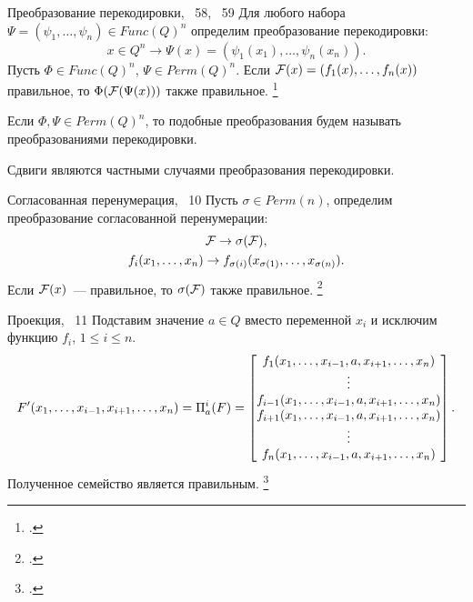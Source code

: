 \begin{frame}
    \begin{mypropos}{Преобразование перекодировки, ~58, ~59}
        \label{thm:reencoding}
        Для любого набора $\Psi = (\psi_1, \ldots, \psi_n) \in Func(Q)^n$ определим преобразование перекодировки:
        \[
            x \in Q^n \to \Psi(x) = (\psi_1(x_1), \ldots, \psi_n(x_n)).
        \]
        Пусть $\Phi \in Func(Q)^n$, $\Psi \in Perm(Q)^n$.
        Если $\mathcal{F}(x) = (f_1(x), \ldots, f_n(x))$ правильное, то $\Phi(\mathcal{F}(\Psi(x)))$ также правильное.
        \footcitetext{galatenko21criterion}
    \end{mypropos}
    \pause
    Если $\Phi, \Psi \in Perm(Q)^n$, то подобные преобразования будем называть преобразованиями перекодировки.
    \pause
    
    Сдвиги являются частными случаями преобразования перекодировки.
\end{frame}


\begin{frame}
    \begin{mypropos}{Согласованная перенумерация, \propos~10}
        Пусть $\sigma \in Perm(n)$, определим преобразование согласованной перенумерации:
        \begin{gather*}
            \mathcal{F} \to \sigma(\mathcal{F}), \\
            f_i(x_1, \ldots, x_n) \to 
            f_{\sigma(i)}(x_{\sigma(1)}, \ldots, x_{\sigma(n)}).
        \end{gather*}
        Если $\mathcal{F}(x)$~--- правильное, то $\sigma(\mathcal{F})$ также правильное.
        \footcitetext{nosov06abel}
    \end{mypropos}
\end{frame}


\begin{frame}
    \begin{mypropos}{Проекция, \propos~11}
        Подставим значение $a \in Q$ вместо переменной $x_i$ и исключим функцию $f_i$, $1 \le i \le n$.
        \[
            F'(x_1,\ldots,x_{i-1}, x_{i+1}, \ldots, x_n) = \Pi^i_a(F) =
            \begin{bmatrix}
              f_1(x_1,\ldots,x_{i-1}, a, x_{i+1}, \ldots, x_n) \\
              \vdots \\
              f_{i-1}(x_1,\ldots,x_{i-1}, a, x_{i+1}, \ldots, x_n) \\
              f_{i+1}(x_1,\ldots,x_{i-1}, a, x_{i+1}, \ldots, x_n) \\
              \vdots \\
              f_{n}(x_1,\ldots,x_{i-1}, a, x_{i+1}, \ldots, x_n) \\
            \end{bmatrix}.
        \]
        Полученное семейство является правильным.
        \footcitetext{galatenko2020latin}
    \end{mypropos}
\end{frame}


